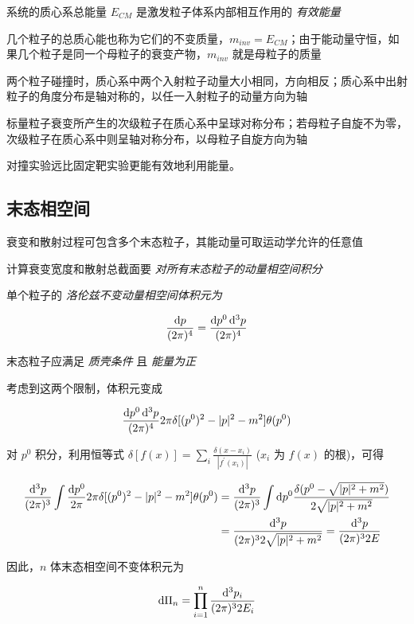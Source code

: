 系统的质心系总能量 $E_{CM}$ 是激发粒子体系内部相互作用的 \emph{有效能量}

几个粒子的总质心能也称为它们的不变质量，$m_{inv}=E_{CM}$；由于能动量守恒，如果几个粒子是同一个母粒子的衰变产物，$m_{inv}$ 就是母粒子的质量

两个粒子碰撞时，质心系中两个入射粒子动量大小相同，方向相反；质心系中出射粒子的角度分布是轴对称的，以任一入射粒子的动量方向为轴

标量粒子衰变所产生的次级粒子在质心系中呈球对称分布；若母粒子自旋不为零，次级粒子在质心系中则呈轴对称分布，以母粒子自旋方向为轴

对撞实验远比固定靶实验更能有效地利用能量。

\subsection{末态相空间}

衰变和散射过程可包含多个末态粒子，其能动量可取运动学允许的任意值

计算衰变宽度和散射总截面要 \emph{对所有末态粒子的动量相空间积分}

单个粒子的 \emph{洛伦兹不变动量相空间体积元为}

\begin{equation}
    \frac{\mathop{}\!\mathrm{d} p}{(2\pi)^4} = \frac{\mathop{}\!\mathrm{d} p^0 \mathop{}\!\mathrm{d}^3 p}{(2\pi)^4}
\end{equation}

末态粒子应满足 \emph{质壳条件} 且 \emph{能量为正}

考虑到这两个限制，体积元变成

\begin{equation}
    \frac{\mathop{}\!\mathrm{d} p^0 \mathop{}\!\mathrm{d}^3 p}{(2\pi)^4} 2\pi\delta [(p^0)^2-|p|^2-m^2] \theta(p^0)
\end{equation}

对 $p^0$ 积分，利用恒等式 $\delta[f(x)] = \sum_i \frac{\delta(x-x_i)}{|f^\prime(x_i)|}$ ($x_i$ 为 $f(x)$ 的根)，可得

\begin{align}
    \frac{\mathop{}\!\mathrm{d}^3 p}{(2\pi)^3} \int \frac{\mathop{}\!\mathrm{d} p^0}{2\pi} 2\pi\delta[(p^0)^2-|p|^2-m^2] \theta(p^0) &= \frac{\mathop{}\!\mathrm{d}^3 p}{(2\pi)^3} \int \mathop{}\!\mathrm{d} p^0 \frac{\delta(p^0-\sqrt{|p|^2+m^2})}{2\sqrt{|p|^2+m^2}} \\
    &= \frac{\mathop{}\!\mathrm{d}^3 p}{(2\pi)^3 2\sqrt{|p|^2+m^2}} = \frac{\mathop{}\!\mathrm{d}^3 p}{(2\pi)^3 2E}
\end{align}

因此，$n$ 体末态相空间不变体积元为

\begin{equation}
    \mathop{}\!\mathrm{d} \Pi_n = \prod_{i=1}^n \frac{\mathop{}\!\mathrm{d}^3 p_i}{(2\pi)^3 2E_i}
\end{equation}

